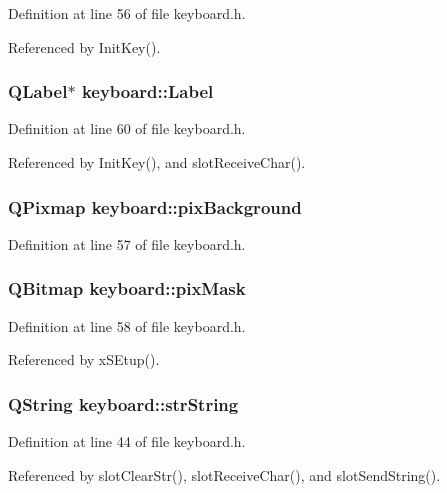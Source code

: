 Definition at line 56 of file keyboard.h.

Referenced by Init\-Key().
\subsubsection{\setlength{\rightskip}{0pt plus 5cm}QLabel$\ast$ {\bf keyboard::Label}\hspace{0.3cm}{\tt  [private]}}\label{classkeyboard_keyboardr43}




Definition at line 60 of file keyboard.h.

Referenced by Init\-Key(), and slot\-Receive\-Char().
\subsubsection{\setlength{\rightskip}{0pt plus 5cm}QPixmap {\bf keyboard::pix\-Background}\hspace{0.3cm}{\tt  [private]}}\label{classkeyboard_keyboardr41}




Definition at line 57 of file keyboard.h.
\subsubsection{\setlength{\rightskip}{0pt plus 5cm}QBitmap {\bf keyboard::pix\-Mask}\hspace{0.3cm}{\tt  [private]}}\label{classkeyboard_keyboardr42}




Definition at line 58 of file keyboard.h.

Referenced by x\-SEtup().
\subsubsection{\setlength{\rightskip}{0pt plus 5cm}QString {\bf keyboard::str\-String}}\label{classkeyboard_keyboardo0}




Definition at line 44 of file keyboard.h.

Referenced by slot\-Clear\-Str(), slot\-Receive\-Char(), and slot\-Send\-String().
